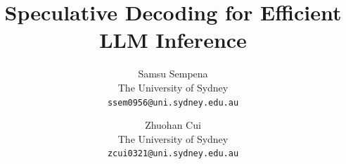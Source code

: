 \documentclass[10pt,twocolumn,letterpaper]{article}
\begin{document}
\title{Speculative Decoding for Efficient LLM Inference}

\author{Samsu Sempena\\
The University of Sydney\\
{\tt\small ssem0956@uni.sydney.edu.au}
\and
Zhuohan Cui\\
The University of Sydney\\
{\tt\small zcui0321@uni.sydney.edu.au}
}

\maketitle



















{\small


}
\end{document}
